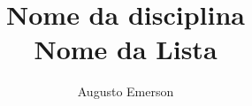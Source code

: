 \documentclass{article}
\title{
    \textbf{Nome da disciplina}\\
    Nome da Lista
}
\author{
    Augusto Emerson\\
}
\date{} %
\begin{document}
\begin{titlepage}
    \maketitle
    \thispagestyle{empty}  
\end{titlepage}
\end{document}
